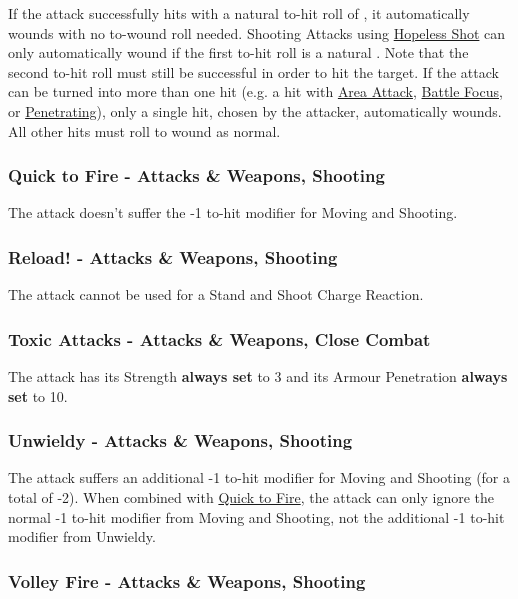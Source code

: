 If the attack successfully hits with a natural to-hit roll of , it automatically wounds with no to-wound roll needed. Shooting Attacks using \hyperref[hopeless_shots]{Hopeless Shot} can only automatically wound if the first to-hit roll is a natural . Note that the second to-hit roll must still be successful in order to hit the target. If the attack can be turned into more than one hit (e.g. a hit with \hyperref[area_attack]{Area Attack}, \hyperref[battle_focus]{Battle Focus}, or \hyperref[penetrating]{Penetrating}), only a single hit, chosen by the attacker,  automatically wounds. All other hits must roll to wound as normal. 

\subsubsection{Quick to Fire - Attacks \&{} Weapons, Shooting}
\label{quick_to_fire}

The attack doesn't suffer the -1 to-hit modifier for Moving and Shooting.

\subsubsection{Reload! - Attacks \&{} Weapons, Shooting}
\label{reload}

The attack cannot be used for a Stand and Shoot Charge Reaction.

\subsubsection{Toxic Attacks - Attacks \& Weapons, Close Combat}
\label{toxic_attacks}

The attack has its Strength \textbf{always set} to 3 and its Armour Penetration \textbf{always set} to 10.

\subsubsection{Unwieldy - Attacks \&{} Weapons, Shooting}
\label{unwieldy}

The attack suffers an additional -1 to-hit modifier for Moving and Shooting (for a total of -2). When combined with \hyperref[quick_to_fire]{Quick to Fire}, the attack can only ignore the normal -1 to-hit modifier from Moving and Shooting, not the additional -1 to-hit modifier from Unwieldy.

\subsubsection{Volley Fire - Attacks \&{} Weapons, Shooting}
\label{volley_fire}

